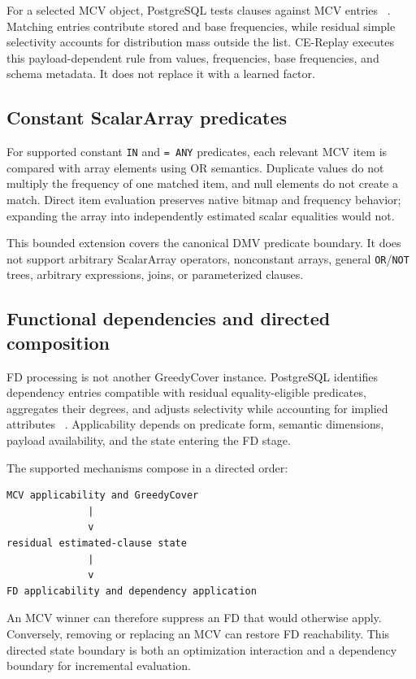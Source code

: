 \documentclass[sigconf,nonacm]{acmart}
\begin{document}
For a selected MCV object, PostgreSQL tests clauses against MCV entries ~\cite{postgresql16docs,postgresql16source}. Matching entries contribute stored and base frequencies, while residual simple selectivity accounts for distribution mass outside the list. CE-Replay executes this payload-dependent rule from values, frequencies, base frequencies, and schema metadata. It does not replace it with a learned factor.

\subsection{Constant ScalarArray predicates}

For supported constant \texttt{IN} and \texttt{= ANY} predicates, each relevant MCV item is compared with array elements using OR semantics. Duplicate values do not multiply the frequency of one matched item, and null elements do not create a match. Direct item evaluation preserves native bitmap and frequency behavior; expanding the array into independently estimated scalar equalities would not.

This bounded extension covers the canonical DMV predicate boundary. It does not support arbitrary ScalarArray operators, nonconstant arrays, general \texttt{OR}/\texttt{NOT} trees, arbitrary expressions, joins, or parameterized clauses.

\subsection{Functional dependencies and directed composition}

FD processing is not another GreedyCover instance. PostgreSQL identifies dependency entries compatible with residual equality-eligible predicates, aggregates their degrees, and adjusts selectivity while accounting for implied attributes ~\cite{postgresql16source}. Applicability depends on predicate form, semantic dimensions, payload availability, and the state entering the FD stage.

The supported mechanisms compose in a directed order:

\begin{verbatim}
MCV applicability and GreedyCover
              |
              v
residual estimated-clause state
              |
              v
FD applicability and dependency application
\end{verbatim}

An MCV winner can therefore suppress an FD that would otherwise apply. Conversely, removing or replacing an MCV can restore FD reachability. This directed state boundary is both an optimization interaction and a dependency boundary for incremental evaluation.
\end{document}
